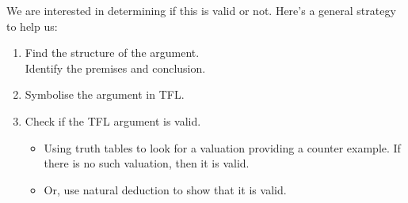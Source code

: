 We are interested in determining if this is valid or not. Here's a general strategy to help us:
\begin{highlighted}\begin{enumerate}
\item Find the structure of the argument. \\Identify the premises and conclusion.
\item \label{itm:validity-symbolise}Symbolise the argument in TFL.
\item \label{itm:validity-TTs} Check if the TFL argument is valid.\begin{itemize}\item Using truth tables to look for a valuation providing a counter example. If there is no such valuation, then it is valid.
\item Or, use natural deduction to show that it is valid.
\end{itemize}
\end{enumerate}
\end{highlighted}

